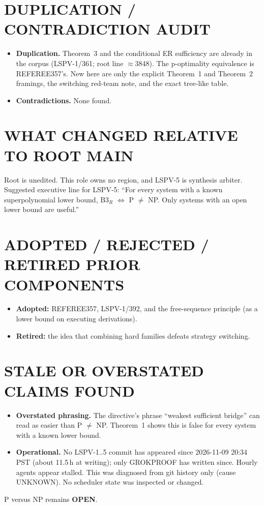 \documentclass[11pt]{article}
\begin{document}
\section*{DUPLICATION / CONTRADICTION AUDIT}
\begin{itemize}
\item \textbf{Duplication.} Theorem~3 and the conditional ER sufficiency are already
in the corpus (LSPV-1/361; root line $\approx$3848). The p-optimality equivalence
is REFEREE357's. New here are only the explicit Theorem~1 and Theorem~2 framings, the
switching red-team note, and the exact tree-like table.
\item \textbf{Contradictions.} None found.
\end{itemize}

\section*{WHAT CHANGED RELATIVE TO ROOT MAIN}
Root  is unedited. This role owns no region, and LSPV-5 is synthesis
arbiter. Suggested executive line for LSPV-5: ``For every system with a known
superpolynomial lower bound, B3$_R$ $\Leftrightarrow$ P $\neq$ NP. Only systems with
an open lower bound are useful.''

\section*{ADOPTED / REJECTED / RETIRED PRIOR COMPONENTS}
\begin{itemize}
\item \textbf{Adopted:} REFEREE357, LSPV-1/392, and the free-sequence principle (as a lower bound on executing derivations).
\item \textbf{Retired:} the idea that combining hard families defeats strategy switching.
\end{itemize}

\section*{STALE OR OVERSTATED CLAIMS FOUND}
\begin{itemize}
\item \textbf{Overstated phrasing.} The directive's phrase ``weakest sufficient bridge''
can read as easier than P $\neq$ NP. Theorem~1 shows this is false for every system
with a known lower bound.
\item \textbf{Operational.} No LSPV-1..5 commit has appeared since 2026-11-09 20:34 PST
(about 11.5\,h at writing); only GROKPROOF has written since. Hourly agents appear stalled.
This was diagnosed from git history only (cause UNKNOWN). No scheduler state was inspected or changed.
\end{itemize}

\noindent P versus NP remains \textbf{OPEN}.
\end{document}
